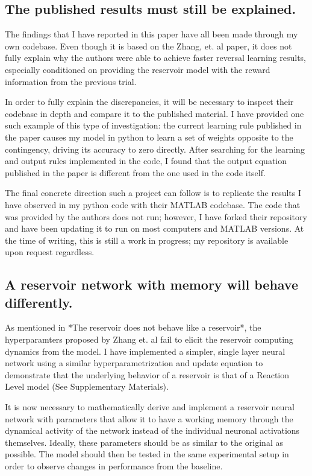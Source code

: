 \documentclass[11pt]{article}
\begin{document}
\subsection{The published results must still be explained.}
The findings that I have reported in this paper have all been made through my own codebase.  Even though it is based on the Zhang, et. al paper, it does not fully explain why the authors were able to achieve faster reversal learning results, especially conditioned on providing the reservoir model with the reward information from the previous trial.

In order to fully explain the discrepancies, it will be necessary to inspect their codebase in depth and compare it to the published material.  I have provided one such example of this type of investigation: the current learning rule published in the paper causes my model in python to learn a set of weights opposite to the contingency, driving its accuracy to zero directly.  After searching for the learning and output rules implemented in the code, I found that the output equation published in the paper is different from the one used in the code itself.

The final concrete direction such a project can follow is to replicate the results I have observed in my python code with their MATLAB codebase.  The code that was provided by the authors does not run; however, I have forked their repository and have been updating it to run on most computers and MATLAB versions.  At the time of writing, this is still a work in progress; my repository is available upon request regardless.

\subsection{A reservoir network with memory will behave differently.}
As mentioned in *The reservoir does not behave like a reservoir*, the hyperparamters proposed by Zhang et. al fail to elicit the reservoir computing dynamics from the model.  I have implemented a simpler, single layer neural network using a similar hyperparametrization and update equation to demonstrate that the underlying behavior of a reservoir is that of a Reaction Level model (See Supplementary Materials).

It is now necessary to mathematically derive and implement a reservoir neural network with parameters that allow it to have a working memory through the dynamical activity of the network instead of the individual neuronal activations themselves.  Ideally, these parameters should be as similar to the original as possible.  The model should then be tested in the same experimental setup in order to observe changes in performance from the baseline.
\end{document}
